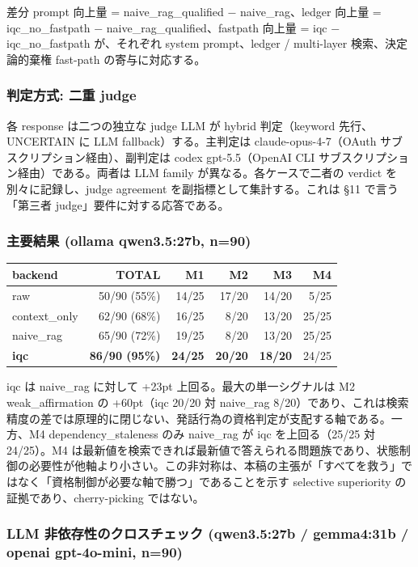 \documentclass[12pt,a4paper]{article}
\begin{document}
差分 prompt 向上量 = naive\_rag\_qualified − naive\_rag、ledger 向上量 = iqc\_no\_fastpath − naive\_rag\_qualified、fastpath 向上量 = iqc − iqc\_no\_fastpath が、それぞれ system prompt、ledger / multi-layer 検索、決定論的棄権 fast-path の寄与に対応する。

\subsubsection{判定方式: 二重 judge}

各 response は二つの独立な judge LLM が hybrid 判定（keyword 先行、UNCERTAIN に LLM fallback）する。主判定は claude-opus-4-7（OAuth サブスクリプション経由）、副判定は codex gpt-5.5（OpenAI CLI サブスクリプション経由）である。両者は LLM family が異なる。各ケースで二者の verdict を別々に記録し、judge agreement を副指標として集計する。これは \S11 で言う「第三者 judge」要件に対する応答である。

\subsubsection{主要結果 (ollama qwen3.5:27b, n=90)}

{\def\LTcaptype{table}
\begin{longtable}[]{@{}lrrrrr@{}}
\toprule\noalign{}
backend & TOTAL & M1 & M2 & M3 & M4 \\
\midrule\noalign{}
\endhead
\bottomrule\noalign{}
\endlastfoot
raw & 50/90 (55\%) & 14/25 & 17/20 & 14/20 & 5/25 \\
context\_only & 62/90 (68\%) & 16/25 & 8/20 & 13/20 & 25/25 \\
naive\_rag & 65/90 (72\%) & 19/25 & 8/20 & 13/20 & 25/25 \\
\textbf{iqc} & \textbf{86/90 (95\%)} & \textbf{24/25} & \textbf{20/20} & \textbf{18/20} & 24/25 \\
\end{longtable}
}

iqc は naive\_rag に対して +23pt 上回る。最大の単一シグナルは M2 weak\_affirmation の +60pt（iqc 20/20 対 naive\_rag 8/20）であり、これは検索精度の差では原理的に閉じない、発話行為の資格判定が支配する軸である。一方、M4 dependency\_staleness のみ naive\_rag が iqc を上回る（25/25 対 24/25）。M4 は最新値を検索できれば最新値で答えられる問題族であり、状態制御の必要性が他軸より小さい。この非対称は、本稿の主張が「すべてを救う」ではなく「資格制御が必要な軸で勝つ」であることを示す selective superiority の証拠であり、cherry-picking ではない。

\subsubsection{LLM 非依存性のクロスチェック (qwen3.5:27b / gemma4:31b / openai gpt-4o-mini, n=90)}
\end{document}

